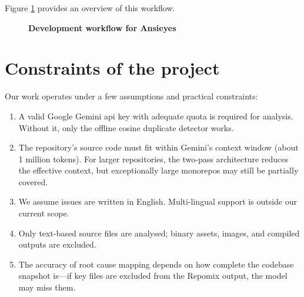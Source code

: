 Figure \ref{fig:methodology} provides an overview of this workflow.

\begin{figure}[htb]
\centering
{}
\caption[Development workflow for Ansieyes]{\textbf{Development workflow for Ansieyes}}
\label{fig:methodology}
\end{figure}

\section{Constraints of the project}

Our work operates under a few assumptions and practical constraints:
\begin{enumerate}
\item A valid Google Gemini \gls{api} key with adequate quota is required for analysis. Without it, only the offline cosine duplicate detector works.
\item The repository's source code must fit within Gemini's context window (about 1 million tokens). For larger repositories, the two-pass architecture reduces the effective context, but exceptionally large monorepos may still be partially covered.
\item We assume issues are written in English. Multi-lingual support is outside our current scope.
\item Only text-based source files are analysed; binary assets, images, and compiled outputs are excluded.
\item The accuracy of root cause mapping depends on how complete the codebase snapshot is---if key files are excluded from the Repomix output, the model may miss them.
\end{enumerate}

